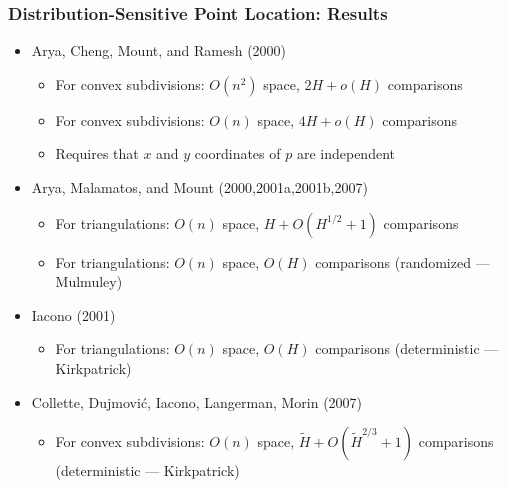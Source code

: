 \documentclass{beamer}
\begin{document}
\frame
{
   \frametitle{Distribution-Sensitive Point Location: Results}
   \begin{itemize}
   \item<1-> Arya, Cheng, Mount, and Ramesh (2000)
    \begin{itemize}
      \item<1->For convex subdivisions: $O(n^2)$ space, $2H+o(H)$ comparisons
      \item<1->For convex subdivisions: $O(n)$ space, $4H+o(H)$ comparisons
      \item<1->Requires that $x$ and $y$ coordinates of $p$ are independent
    \end{itemize}
   \item<2-> Arya, Malamatos, and Mount (2000,2001a,2001b,2007)
    \begin{itemize}
      \item<2->For triangulations: $O(n)$ space, $H+O(H^{1/2}+1)$ comparisons
      \item<3->For triangulations: $O(n)$ space, $O(H)$ comparisons
(randomized --- Mulmuley)
    \end{itemize} 
    \item<4-> Iacono (2001)
    \begin{itemize}
      \item<4->For triangulations: $O(n)$ space, $O(H)$ comparisons
(deterministic --- Kirkpatrick)
    \end{itemize} 
    \item<5-> Collette, Dujmovi\'c, Iacono, Langerman, Morin (2007)
    \begin{itemize}
      \item<5->For convex subdivisions: $O(n)$ space, $\tilde{H} + O(\tilde{H}^{2/3} + 1)$ comparisons
(deterministic --- Kirkpatrick)
    \end{itemize} 
   \end{itemize}



}
\end{document}
